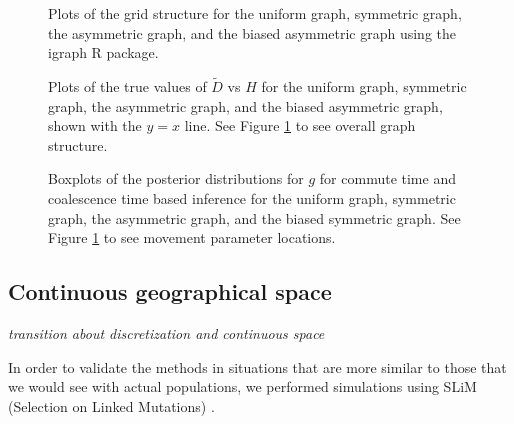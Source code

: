\documentclass{article}
\newcommand{\Dcom}{\widetilde D}
\newcommand{\plr}[1]{{\em \color{blue} #1}}
\begin{document}

\begin{figure}
\centering
\caption{Plots of the grid structure 
for the uniform graph, symmetric graph, the asymmetric graph,
and the biased asymmetric graph 
using the igraph R package.}
\label{fig:4x4_grids}
\end{figure}

\begin{figure}
\centering
\caption{Plots of the true values of $\Dcom$ vs $H$ 
for the uniform graph, symmetric graph, the asymmetric graph,
and the biased asymmetric graph, 
shown with the $y=x$ line.
See Figure \ref{fig:4x4_grids} to see overall graph structure.}
\label{fig:4x4coalvcomH}
\end{figure}

\begin{figure}
\centering
\caption{Boxplots of the posterior distributions for $g$ for commute time and coalescence time
based inference for the uniform graph, symmetric graph, 
the asymmetric graph, and the biased symmetric graph.
See Figure \ref{fig:4x4_grids} to see movement parameter locations.}
\label{fig:4x4box}
\end{figure}


\subsection*{Continuous geographical space}

\plr{transition about discretization and continuous space}

In order to validate the methods in situations 
that are more similar to those that we would see with actual populations,
we performed simulations using SLiM (Selection on Linked Mutations) \citep{haller2016slim}.
\end{document}
